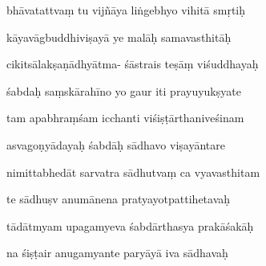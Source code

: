 \documentclass[article,12pt,a4paper]{memoir}%
\newcounter{parCount}
\begin{document}
	  
	  \pstart \leavevmode%
	bhāvatattvaṃ tu vijñāya liṅgebhyo vihitā smṛtiḥ 
	{}
	\pend%
      

	  
	  \pstart {} kāyavāgbuddhiviṣayā ye malāḥ samavasthitāḥ 
	{}
	\pend%
      

	  
	  \pstart \leavevmode%
	cikitsālakṣaṇādhyātma- śāstrais teṣāṃ viśuddhayaḥ 
	{}
	\pend%
      

	  
	  \pstart {} śabdaḥ saṃskārahīno yo gaur iti prayuyukṣyate 
	{}
	\pend%
      

	  
	  \pstart \leavevmode%
	tam apabhraṃśam icchanti viśiṣṭārthaniveśinam 
	{}
	\pend%
      

	  
	  \pstart {} asvagoṇyādayaḥ śabdāḥ sādhavo viṣayāntare 
	{}
	\pend%
      

	  
	  \pstart \leavevmode%
	nimittabhedāt sarvatra sādhutvaṃ ca vyavasthitam 
	{}
	\pend%
      

	  
	  \pstart {} te sādhuṣv anumānena pratyayotpattihetavaḥ 
	{}
	\pend%
      

	  
	  \pstart \leavevmode%
	tādātmyam upagamyeva śabdārthasya prakāśakāḥ 
	{}
	\pend%
      

	  
	  \pstart {} na śiṣṭair anugamyante paryāyā iva sādhavaḥ 
	{}
	\pend%
      
\end{document}
